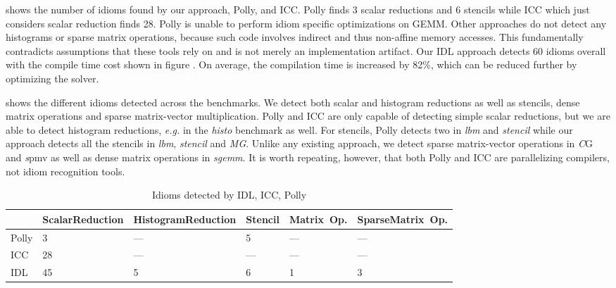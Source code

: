      shows the number of idioms found by our approach, Polly, and ICC.
    Polly finds 3 scalar reductions and 6 stencils while ICC which just considers  scalar reduction finds 28.
    Polly is unable to perform idiom specific optimizations on GEMM.
    Other approaches do not detect any histograms or sparse matrix operations, because such code involves indirect and thus non-affine memory accesses.
    This fundamentally contradicts assumptions that these tools rely on and is not merely an implementation artifact.
    Our IDL approach detects 60 idioms overall with the compile time cost shown in figure .
    On average, the compilation time is increased by 82\%, which can be reduced further by optimizing the solver.

     shows the different idioms detected across
    the  benchmarks. We detect both scalar
    and histogram reductions as well as stencils, dense matrix operations
    and sparse matrix-vector multiplication.
    Polly and ICC are only capable of detecting simple scalar
    reductions, but we are able to detect histogram reductions, {\em e.g.} in
    the \emph{histo} benchmark as well.  For stencils, Polly detects two
    in \emph{lbm} and \emph{stencil} while our approach
    detects all the stencils in \emph{lbm}, \emph{stencil} and \emph{MG}.
    Unlike any existing approach, we detect sparse matrix-vector
    operations in {\emph CG} and {\emph spmv} as well as dense matrix
    operations in \emph{sgemm}. It is worth repeating, however, that both
    Polly and ICC are parallelizing compilers, not idiom recognition
    tools.

\begin{table}[t]
\centering
  \footnotesize
  \begin{tabular}{lP{2.16cm}P{2.16cm}P{2.16cm}P{2.163cm}P{2.163cm}}
  \toprule
  & Scalar\newline{}Reduction & Histogram\newline{}Reduction & Stencil & Matrix~Op. & Sparse\newline{}Matrix~Op.\\
  \midrule
  Polly &  3  &  --- &   5  &  --- & --- \\[0.25em]
  ICC   &  28 &  --- &  --- &  --- & --- \\[0.25em]
  IDL   &  45 &   5  &   6  &   1  &  3  \\
  \bottomrule
\end{tabular}

  \vspace{.1cm}
\caption{Idioms detected by IDL, ICC, Polly}
\label{tab:detection}
\vspace{-1em}
\end{table}

